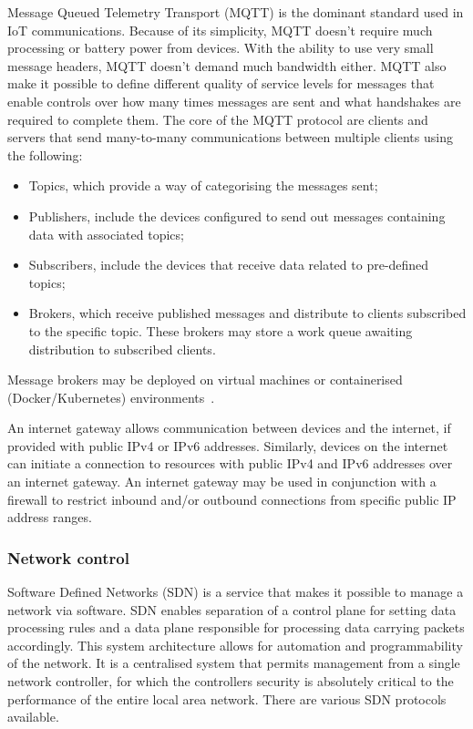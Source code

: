 \documentclass[11pt, oneside]{article}   	%
\begin{document}
Message Queued Telemetry Transport (MQTT) is the dominant standard used in IoT communications.
Because of its simplicity, MQTT doesn’t require much processing or battery power from devices.
With the ability to use very small message headers, MQTT doesn’t demand much bandwidth either.
MQTT also make it possible to define different quality of service levels for messages that enable controls over how many times messages are sent and what handshakes are required to complete them.
The core of the MQTT protocol are clients and servers that send many-to-many communications between multiple clients using the following:
\begin{itemize}
	\item Topics, which provide a way of categorising the messages sent; 
	\item Publishers, include the devices configured to send out messages containing data with associated topics;
	\item Subscribers, include the devices that receive data related to pre-defined topics;
	\item Brokers, which receive published messages and distribute to clients subscribed to the specific topic. These brokers may store a work queue awaiting distribution to subscribed clients.
\end{itemize}
Message brokers may be deployed on virtual machines or containerised (Docker/Kubernetes) environments~\cite{mqtt}.\

An internet gateway allows communication between devices and the internet, if provided with public IPv4 or IPv6 addresses.
Similarly, devices on the internet can initiate a connection to resources with public IPv4 and IPv6 addresses over an internet gateway.
An internet gateway may be used in conjunction with a firewall to restrict inbound and/or outbound connections from specific public IP address ranges.\

\subsubsection{Network control}
Software Defined Networks (SDN) is a service that makes it possible to manage a network via software.
SDN enables separation of a control plane for setting data processing rules and a data plane responsible for processing data carrying packets accordingly.
This system architecture allows for automation and programmability of the network.
It is a centralised system that permits management from a single network controller, for which the controllers security is absolutely critical to the performance of the entire local area network.
There are various SDN protocols available.\
\end{document}
